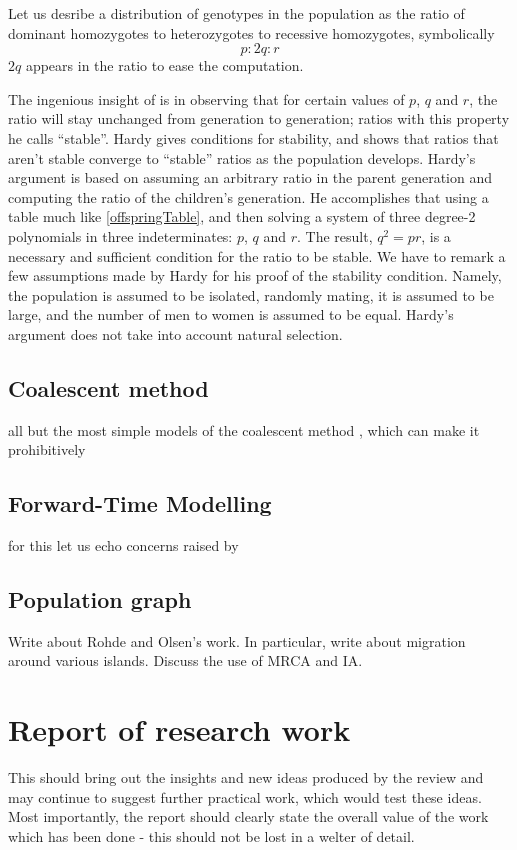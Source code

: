 \documentclass{l4proj}
\begin{document}
\begin{samepage}
Let us desribe a distribution of genotypes in the population as the ratio of dominant homozygotes to heterozygotes to recessive homozygotes, symbolically $$p:2q:r$$ $2q$ appears in the ratio to ease the computation.
\end{samepage}

The ingenious insight of \cite{hardy08} is in observing that for certain values of $p$, $q$ and $r$, the ratio will stay unchanged from generation to generation; ratios with this property he calls ``stable''. Hardy gives conditions for stability, and shows that ratios that aren't stable converge to ``stable'' ratios as the population develops. Hardy's argument is based on assuming an arbitrary ratio in the parent generation and computing the ratio of the children's generation. He accomplishes that using a table much like \ref{offspringTable}, and then solving a system of three degree-2 polynomials in three indeterminates: $p$, $q$ and $r$. The result, $q^{2}=pr$, is a necessary and sufficient condition for the ratio to be stable. We have to remark a few assumptions made by Hardy for his proof of the stability condition. Namely, the population is assumed to be isolated, randomly mating, it is assumed to be large, and the number of men to women is assumed to be equal. Hardy's argument does not take into account natural selection.

\section{Coalescent method}

 all but the most simple models of the coalescent method , which can make it prohibitively

\section{Forward-Time Modelling}

for this let us echo concerns raised by \cite{peng10}

\section{Population graph}

Write about Rohde and Olsen's work. In particular, write about migration around various islands. Discuss the use of MRCA and IA.

\chapter{Report of research work}\label{research}
This should bring out the insights and new ideas produced by the review and may continue to suggest further practical work, which would test these ideas. Most importantly, the report should clearly state the overall value of the work which has been done - this should not be lost in a welter of detail.
\end{document}
